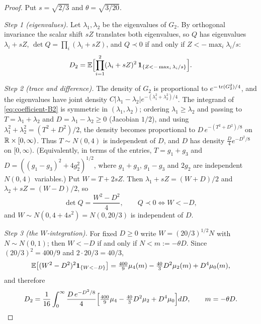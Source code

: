 \begin{proof}
Put $s=\sqrt{2/3}$ and $\theta=\sqrt{3/20}$.

\emph{Step 1 (eigenvalues).} Let $\lambda_1,\lambda_2$ be the eigenvalues of $G_2$. By orthogonal invariance the scalar shift $sZ$ translates both eigenvalues, so $Q$ has eigenvalues $\lambda_i+sZ$, $\det Q=\prod_i(\lambda_i+sZ)$, and $Q\prec0$ if and only if $Z<-\max_i\lambda_i/s$:
\begin{equation}\label{eq:coefficient-B2}
D_2=\mathbb E\Bigl[\prod_{i=1}^2(\lambda_i+sZ)^2\,\mathbf 1_{\{Z<-\max_i\lambda_i/s\}}\Bigr].
\end{equation}

\emph{Step 2 (trace and difference).} The density of $G_2$ is proportional to $e^{-\operatorname{tr}(G_2^2)/4}$, and the eigenvalues have joint density $C|\lambda_1-\lambda_2|e^{-(\lambda_1^2+\lambda_2^2)/4}$. The integrand of \eqref{eq:coefficient-B2} is symmetric in $(\lambda_1,\lambda_2)$; ordering $\lambda_1\ge\lambda_2$ and passing to $T=\lambda_1+\lambda_2$ and $D=\lambda_1-\lambda_2\ge0$ (Jacobian $1/2$), and using $\lambda_1^2+\lambda_2^2=(T^2+D^2)/2$, the density becomes proportional to $D\,e^{-(T^2+D^2)/8}$ on $\mathbb R\times[0,\infty)$. Thus $T\sim N(0,4)$ is independent of $D$, and $D$ has density $\frac D4e^{-D^2/8}$ on $[0,\infty)$. (Equivalently, in terms of the entries, $T=g_1+g_3$ and $D=((g_1-g_3)^2+4g_2^2)^{1/2}$, where $g_1+g_3$, $g_1-g_3$ and $2g_2$ are independent $N(0,4)$ variables.) Put $W=T+2sZ$. Then $\lambda_1+sZ=(W+D)/2$ and $\lambda_2+sZ=(W-D)/2$, so
\begin{equation}\label{eq:coefficient-WD}
\det Q=\frac{W^2-D^2}{4},\qquad Q\prec0\iff W<-D,
\end{equation}
and $W\sim N(0,4+4s^2)=N(0,20/3)$ is independent of $D$.

\emph{Step 3 (the $W$-integration).} For fixed $D\ge0$ write $W=(20/3)^{1/2}N$ with $N\sim N(0,1)$; then $W<-D$ if and only if $N<m:=-\theta D$. Since $(20/3)^2=400/9$ and $2\cdot20/3=40/3$,
\[
\mathbb E\bigl[(W^2-D^2)^2\mathbf 1_{\{W<-D\}}\bigr]=\tfrac{400}{9}\mu_4(m)-\tfrac{40}{3}D^2\mu_2(m)+D^4\mu_0(m),
\]
and therefore
\begin{equation}\label{eq:coefficient-B2prime}
D_2=\frac1{16}\int_0^\infty\frac{D\,e^{-D^2/8}}{4}\Bigl[\tfrac{400}{9}\mu_4-\tfrac{40}{3}D^2\mu_2+D^4\mu_0\Bigr]dD,\qquad m=-\theta D .
\end{equation}


\end{proof}
